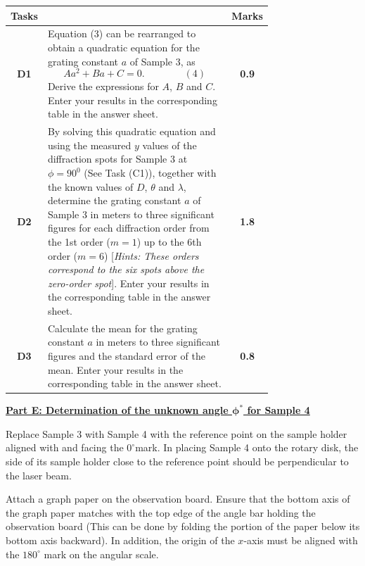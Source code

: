 \noindent\begin{tabular}{|c|p{0.74\linewidth}|c|}
\hline
\textbf{Tasks} & & \textbf{Marks} \\ \hline
\textbf{D1} & Equation (3) can be rearranged to obtain a quadratic equation for the grating constant $a$ of Sample 3, as
\[ Aa^2 + Ba + C = 0. \qquad\qquad (4) \]
Derive the expressions for $A$, $B$ and $C$. Enter your results in the corresponding table in the answer sheet. & \textbf{0.9} \\ \hline
\textbf{D2} & By solving this quadratic equation and using the measured $y$ values of the diffraction spots for Sample 3 at $\phi = 90^{0}$ (See Task (C1)), together with the known values of $D$, $\theta$ and $\lambda$, determine the grating constant $a$ of Sample 3 in meters to three significant figures for each diffraction order from the 1st order ($m = 1$) up to the 6th order ($m = 6$) [\textit{Hints: These orders correspond to the six spots above the zero-order spot}]. Enter your results in the corresponding table in the answer sheet. & \textbf{1.8} \\ \hline
\textbf{D3} & Calculate the mean for the grating constant $a$ in meters to three significant figures and the standard error of the mean. Enter your results in the corresponding table in the answer sheet. & \textbf{0.8} \\ \hline
\end{tabular}

\underline{\textbf{Part E: Determination of the unknown angle $\boldsymbol{\phi}^{*}$ for Sample 4}}

Replace Sample 3 with Sample 4 with the reference point on the sample holder aligned with and facing the $0^{\circ}$mark. In placing Sample 4 onto the rotary disk, the side of its sample holder close to the reference point should be perpendicular to the laser beam.

Attach a graph paper on the observation board. Ensure that the bottom axis of the graph paper matches with the top edge of the angle bar holding the observation board (This can be done by folding the portion of the paper below its bottom axis backward). In addition, the origin of the $x$-axis must be aligned with the $180^{\circ}$ mark on the angular scale.

